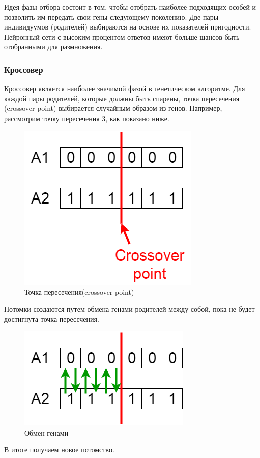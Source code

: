 Идея фазы отбора состоит в том, чтобы отобрать наиболее подходящих особей и позволить им передать свои гены следующему поколению. Две пары индивидуумов (родителей) выбираются на основе их показателей пригодности. Нейронный сети с высоким процентом ответов имеют больше шансов быть отобранными для размножения.

\subsubsection{Кроссовер}
Кроссовер является наиболее значимой фазой в генетическом алгоритме. Для каждой пары родителей, которые должны быть спарены, точка пересечения (crossover point) выбирается случайным образом из генов.
Например, рассмотрим точку пересечения 3, как показано ниже. 

\begin{figure}[h]
  \centering
  \includegraphics[width=0.5\linewidth]{./img/crossover-point}
  \caption{Точка пересечения(crossover point)}
  \label{fig:mpr}
\end{figure} 

Потомки создаются путем обмена генами родителей между собой, пока не будет достигнута точка пересечения.

\begin{figure}[h]
  \centering
  \includegraphics[width=0.5\linewidth]{./img/genesis}
  \caption{Обмен генами}
  \label{fig:mpr}
\end{figure} 

В итоге получаем новое потомство.


